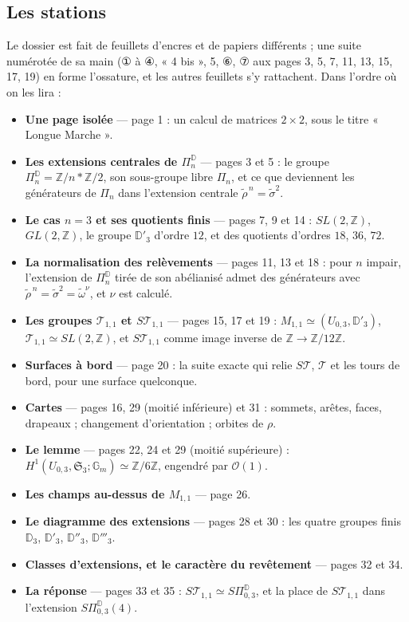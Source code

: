 \documentclass[11pt,a4paper]{article}
\begin{document}
\subsection*{Les stations}

Le dossier est fait de feuillets d'encres et de papiers différents ; une suite
numérotée de sa main (① à ④, « 4 bis », 5, ⑥, ⑦ aux pages 3, 5, 7, 11, 13, 15, 17,
19) en forme l'ossature, et les autres feuillets s'y rattachent. Dans l'ordre où
on les lira :

\begin{itemize}
\item \textbf{Une page isolée} — page 1 : un calcul de matrices $2 \times 2$, sous
le titre « Longue Marche ».
\item \textbf{Les extensions centrales de $\Pi^{\mathbb{D}}_n$} — pages 3 et 5 :
le groupe $\Pi^{\mathbb{D}}_n = \mathbb{Z}/n * \mathbb{Z}/2$, son sous-groupe
libre $\Pi_n$, et ce que deviennent les générateurs de $\Pi_n$ dans l'extension
centrale $\tilde\rho^{\,n} = \tilde\sigma^2$.
\item \textbf{Le cas $n = 3$ et ses quotients finis} — pages 7, 9 et 14 :
$SL(2, \mathbb{Z})$, $GL(2, \mathbb{Z})$, le groupe $\mathbb{D}'_3$ d'ordre $12$,
et des quotients d'ordres $18$, $36$, $72$.
\item \textbf{La normalisation des relèvements} — pages 11, 13 et 18 : pour $n$
impair, l'extension de $\Pi^{\mathbb{D}}_n$ tirée de son abélianisé admet des
générateurs avec $\tilde\rho^{\,n} = \tilde\sigma^2 = \tilde\omega^{\nu}$, et $\nu$
est calculé.
\item \textbf{Les groupes $\mathcal{T}_{1,1}$ et $S\mathcal{T}_{1,1}$} — pages 15,
17 et 19 : $M_{1,1} \simeq (U_{0,3}, \mathbb{D}'_3)$, $\mathcal{T}_{1,1} \simeq
SL(2, \mathbb{Z})$, et $S\mathcal{T}_{1,1}$ comme image inverse de
$\mathbb{Z} \to \mathbb{Z}/12\mathbb{Z}$.
\item \textbf{Surfaces à bord} — page 20 : la suite exacte qui relie
$S\mathcal{T}$, $\mathcal{T}$ et les tours de bord, pour une surface quelconque.
\item \textbf{Cartes} — pages 16, 29 (moitié inférieure) et 31 : sommets, arêtes,
faces, drapeaux ; changement d'orientation ; orbites de $\rho$.
\item \textbf{Le lemme} — pages 22, 24 et 29 (moitié supérieure) :
$H^1(U_{0,3}, \mathfrak{S}_3; \mathbb{G}_m) \simeq \mathbb{Z}/6\mathbb{Z}$, engendré
par $\mathcal{O}(1)$.
\item \textbf{Les champs au-dessus de $M_{1,1}$} — page 26.
\item \textbf{Le diagramme des extensions} — pages 28 et 30 : les quatre groupes
finis $\mathbb{D}_3$, $\mathbb{D}'_3$, $\mathbb{D}''_3$, $\mathbb{D}'''_3$.
\item \textbf{Classes d'extensions, et le caractère du revêtement} — pages 32 et
34.
\item \textbf{La réponse} — pages 33 et 35 : $S\mathcal{T}_{1,1} \simeq
S\Pi^{\mathbb{D}}_{0,3}$, et la place de $S\mathcal{T}_{1,1}$ dans l'extension
$S\Pi^{\mathbb{D}}_{0,3}(4)$.
\end{itemize}
\end{document}

